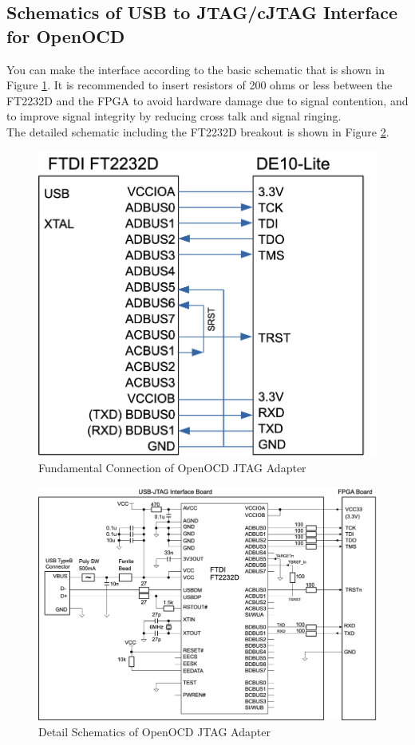 \subsection{Schematics of USB to JTAG/cJTAG Interface for OpenOCD}

You can make the interface according to the basic schematic that is shown in Figure \ref{fig:USBJTAGFUNDAMENTAL}. It is recommended to insert resistors of 200 ohms or less between the FT2232D and the FPGA to avoid hardware damage due to signal contention, and to improve signal integrity by reducing cross talk and signal ringing.\\ The detailed schematic including the FT2232D breakout is shown in Figure \ref{fig:USBJTAGSCHEMATICS}.

\begin{figure}[H]
    \includegraphics[width=0.75\columnwidth]{./Figure/USB_JTAG_Fundamental.png}
    \caption{Fundamental Connection of OpenOCD JTAG Adapter}
    \label{fig:USBJTAGFUNDAMENTAL}
\end{figure}

\begin{figure}[H]
    \includegraphics[width=1.0\columnwidth]{./Figure/USB_JTAG_Schematics.png}
    \caption{Detail Schematics of OpenOCD JTAG Adapter}
    \label{fig:USBJTAGSCHEMATICS}
\end{figure}


